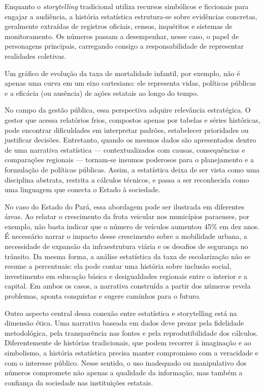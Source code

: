 Enquanto o \textit{storytelling} tradicional utiliza recursos simbólicos e ficcionais para engajar a audiência, a história estatística estrutura-se sobre evidências concretas, geralmente extraídas de registros oficiais, censos, inquéritos e sistemas de monitoramento. Os números passam a desempenhar, nesse caso, o papel de personagens principais, carregando consigo a responsabilidade de representar realidades coletivas. 

Um gráfico de evolução da taxa de mortalidade infantil, por exemplo, não é apenas uma curva em um eixo cartesiano: ele representa vidas, políticas públicas e a eficácia (ou ausência) de ações estatais ao longo do tempo.\vskip0.3cm

No campo da gestão pública, essa perspectiva adquire relevância estratégica. O gestor que acessa relatórios frios, compostos apenas por tabelas e séries históricas, pode encontrar dificuldades em interpretar padrões, estabelecer prioridades ou justificar decisões. Entretanto, quando os mesmos dados são apresentados dentro de uma narrativa estatística — contextualizados com causas, consequências e comparações regionais — tornam-se insumos poderosos para o planejamento e a formulação de políticas públicas. Assim, a estatística deixa de ser vista como uma disciplina abstrata, restrita a cálculos técnicos, e passa a ser reconhecida como uma linguagem que conecta o Estado à sociedade.\vskip0.3cm

No caso do Estado do Pará, essa abordagem pode ser ilustrada em diferentes áreas. Ao relatar o crescimento da frota veicular nos municípios paraenses, por exemplo, não basta indicar que o número de veículos aumentou 45\% em dez anos. É necessário narrar o impacto desse crescimento sobre a mobilidade urbana, a necessidade de expansão da infraestrutura viária e os desafios de segurança no trânsito. Da mesma forma, a análise estatística da taxa de escolarização não se resume a percentuais: ela pode contar uma história sobre inclusão social, investimento em educação básica e desigualdades regionais entre o interior e a capital. Em ambos os casos, a narrativa construída a partir dos números revela problemas, aponta conquistas e sugere caminhos para o futuro.\vskip0.3cm

\newpage
Outro aspecto central dessa conexão entre estatística e storytelling está na dimensão ética. Uma narrativa baseada em dados deve prezar pela fidelidade metodológica, pela transparência nas fontes e pela reprodutibilidade dos cálculos. Diferentemente de histórias tradicionais, que podem recorrer à imaginação e ao simbolismo, a história estatística precisa manter compromisso com a veracidade e com o interesse público. Nesse sentido, o uso inadequado ou manipulativo dos números compromete não apenas a qualidade da informação, mas também a confiança da sociedade nas instituições estatais.\vskip0.3cm

